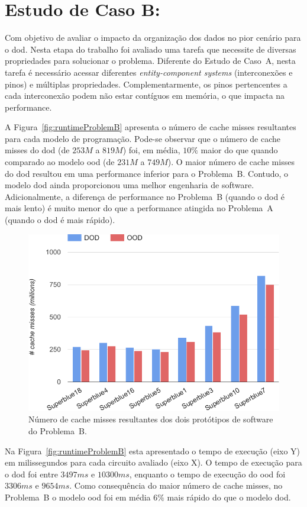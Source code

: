 \section{Estudo de Caso B:}
\label{sec:problema_b}

Com objetivo de avaliar o impacto da organização dos dados no pior cenário para o \ac{dod}. Nesta etapa do trabalho foi avaliado uma tarefa que necessite de diversas propriedades para solucionar o problema.
Diferente do Estudo de Caso~A, nesta tarefa é necessário acessar diferentes \textit{entity-component systems} (interconexões e pinos) e múltiplas propriedades. Complementarmente, os pinos pertencentes a cada interconexão podem não estar contíguos em memória, o que impacta na performance.

A Figura~\ref{fig:runtimeProblemB} apresenta o número de cache misses resultantes para cada modelo de programação. Pode-se observar que o número de cache misses do \ac{dod} (de $253M$ a $819M$) foi, em média, $10\%$ maior do que quando comparado ao modelo \ac{ood} (de $231M$ a $749M$). O maior número de cache misses do \ac{dod} resultou em uma performance inferior para o Problema~B. Contudo, o modelo \ac{dod} ainda proporcionou uma melhor engenharia de software. Adicionalmente, a diferença de performance no Problema~B (quando o \ac{dod} é mais lento) é muito menor do que a performance atingida no Problema~A (quando o \ac{dod} é mais rápido).

\begin{figure}[ht]
    \centering
    \includegraphics[width=0.7\linewidth]{img/results/missProblemB}
    \caption[Cache misses do Problema~B.]{Número de cache misses resultantes dos dois protótipos de software do Problema~B.}
    \label{fig:missProblemB}
\end{figure}

Na Figura~\ref{fig:runtimeProblemB} esta apresentado o tempo de execução (eixo Y) em milissegundos para cada circuito avaliado (eixo X). O tempo de execução para o \ac{dod} foi entre $3497ms$ e $10300ms$, enquanto o tempo de execução do \ac{ood} foi $3306ms$ e $9654ms$. Como consequência do maior número de cache misses, no Problema~B o modelo \ac{ood} foi em média $6\%$ mais rápido do que o modelo \ac{dod}.

